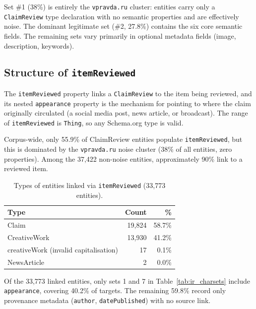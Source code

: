 \documentclass[11pt,a4paper]{article}
\begin{document}
Set \#1 (38\%) is entirely the \texttt{vpravda.ru} cluster: entities carry only
a \texttt{ClaimReview} type declaration with no semantic properties and are
effectively noise.
The dominant legitimate set (\#2, 27.8\%) contains the six core semantic fields.
The remaining sets vary primarily in optional metadata fields (image, description,
keywords).

\subsection{Structure of \texttt{itemReviewed}}

The \texttt{itemReviewed} property links a \texttt{ClaimReview} to the item
being reviewed, and its nested \texttt{appearance} property is the mechanism
for pointing to where the claim originally circulated (a social media post,
news article, or broadcast).
The range of \texttt{itemReviewed} is \texttt{Thing}, so any Schema.org type
is valid.

Corpus-wide, only 55.9\% of ClaimReview entities populate
\texttt{itemReviewed}, but this is dominated by the \texttt{vpravda.ru} noise
cluster (38\% of all entities, zero properties).
Among the 37{,}422 non-noise entities, approximately 90\% link to a reviewed
item.

\begin{table}[H]
\centering
\caption{Types of entities linked via \texttt{itemReviewed} (33{,}773 entities).}
\label{tab:ir_types}
\begin{tabular}{lrr}
\toprule
\textbf{Type} & \textbf{Count} & \textbf{\%} \\
\midrule
Claim        & 19{,}824 & 58.7\% \\
CreativeWork & 13{,}930 & 41.2\% \\
creativeWork (invalid capitalisation) &  17 & 0.1\% \\
NewsArticle  &       2  & 0.0\% \\
\bottomrule
\end{tabular}
\end{table}

Of the 33{,}773 linked entities, only sets 1 and 7 in
Table~\ref{tab:ir_charsets} include \texttt{appearance}, covering 40.2\% of
targets.
The remaining 59.8\% record only provenance metadata (\texttt{author},
\texttt{datePublished}) with no source link.
\end{document}
